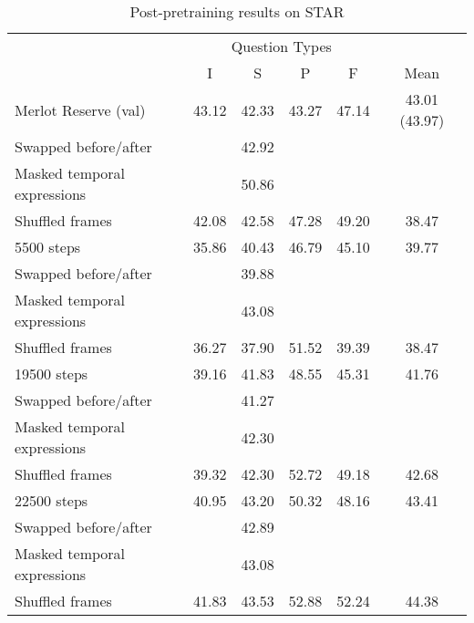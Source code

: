 \begin{table}[htpb]
	\centering
	\caption{Post-pretraining results on STAR}
	\label{tab:label}
	\begin{tabular}{lccccc}
        \toprule
        \multicolumn{1}{c}{}        & \multicolumn{4}{c}{Question Types}        & \multicolumn{1}{c}{} \\
                                      \cmidrule(){2-5}
                                    & I           & S        & P          & F           & Mean \\
        \cmidrule(r){1-1}             \cmidrule(){2-5}                          \cmidrule(l){6-6}
        Merlot Reserve (val)        & 43.12       & 42.33    & 43.27      & 47.14       & 43.01 (43.97) \\
		Swapped before/after		&			  & 42.92    &			  &				& \\
		Masked temporal expressions &			  & 50.86    &			  &				& \\
		Shuffled frames				& 42.08		  & 42.58	 & 47.28	  & 49.20		& 38.47 \\
        \cmidrule(r){1-1}             \cmidrule(){2-5}                          \cmidrule(l){6-6}
		5500 steps					& 35.86		  & 40.43	 & 46.79	  & 45.10		& 39.77 \\
		Swapped before/after		&			  & 39.88	 &			  &				& \\
		Masked temporal expressions &			  & 43.08    &			  &				& \\
		Shuffled frames				& 36.27		  & 37.90	 & 51.52	  & 39.39		& 38.47 \\
        \cmidrule(r){1-1}             \cmidrule(){2-5}                          \cmidrule(l){6-6}
		19500 steps					& 39.16		  & 41.83    & 48.55	  & 45.31		& 41.76 \\
		Swapped before/after		&			  & 41.27	 &			  &				& \\
		Masked temporal expressions &			  & 42.30    &			  &				& \\
		Shuffled frames				& 39.32		  & 42.30	 & 52.72	  & 49.18		& 42.68 \\
        \cmidrule(r){1-1}             \cmidrule(){2-5}                          \cmidrule(l){6-6}
		22500 steps					& 40.95		  & 43.20    & 50.32	  & 48.16		& 43.41 \\
		Swapped before/after		& 			  &	42.89    &			  &				& \\
		Masked temporal expressions &			  & 43.08    &			  &				& \\
		Shuffled frames				& 41.83		  & 43.53	 & 52.88	  & 52.24		& 44.38 \\

\end{tabular}
\end{table}
